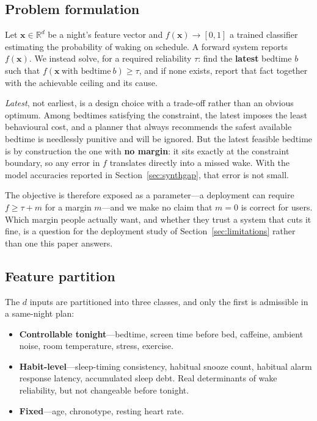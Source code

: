 \documentclass[conference]{IEEEtran}
\begin{document}
\subsection{Problem formulation}

Let $\mathbf{x} \in \mathbb{R}^d$ be a night's feature vector and
$f(\mathbf{x}) \rightarrow [0,1]$ a trained classifier estimating the
probability of waking on schedule. A forward system reports $f(\mathbf{x})$. We
instead solve, for a required reliability $\tau$: find the \textbf{latest}
bedtime $b$ such that $f(\mathbf{x}\ \text{with bedtime}\ b) \ge \tau$, and if
none exists, report that fact together with the achievable ceiling and its
cause.

\emph{Latest}, not earliest, is a design choice with a trade-off rather than an
obvious optimum. Among bedtimes satisfying the constraint, the latest imposes
the least behavioural cost, and a planner that always recommends the safest
available bedtime is needlessly punitive and will be ignored. But the latest
feasible bedtime is by construction the one with \textbf{no margin}: it sits
exactly at the constraint boundary, so any error in $f$ translates directly into
a missed wake. With the model accuracies reported in
Section~\ref{sec:synthgap}, that error is not small.

The objective is therefore exposed as a parameter---a deployment can require
$f \ge \tau + m$ for a margin $m$---and we make no claim that $m = 0$ is correct
for users. Which margin people actually want, and whether they trust a system
that cuts it fine, is a question for the deployment study of
Section~\ref{sec:limitations} rather than one this paper answers.

\subsection{Feature partition}

The $d$ inputs are partitioned into three classes, and only the first is
admissible in a same-night plan:

\begin{itemize}
\item \textbf{Controllable tonight}---bedtime, screen time before bed, caffeine,
      ambient noise, room temperature, stress, exercise.
\item \textbf{Habit-level}---sleep-timing consistency, habitual snooze count,
      habitual alarm response latency, accumulated sleep debt. Real determinants
      of wake reliability, but not changeable before tonight.
\item \textbf{Fixed}---age, chronotype, resting heart rate.
\end{itemize}
\end{document}
